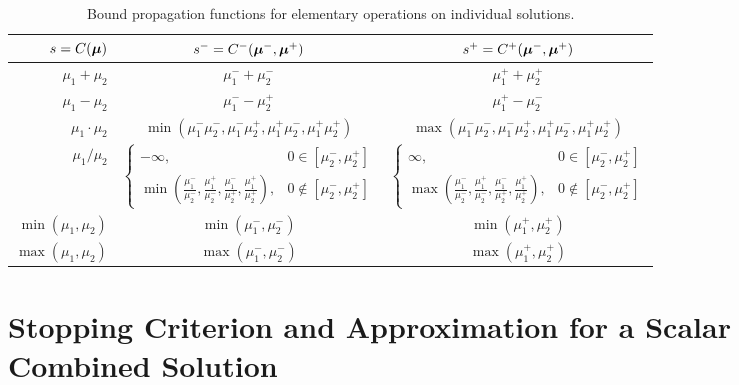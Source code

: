 \documentclass{article}[12pt]
\begin{document}
\begin{table}[t]
\begin{tabular}{r  c  c}
    $s=C(\boldsymbol{\mu})$ & $s^- = C^-(\boldsymbol{\mu}^-,\boldsymbol{\mu}^+)$ & $s^+ = C^+(\boldsymbol{\mu}^-,\boldsymbol{\mu}^+)$ \\
    \hline
    $\mu_1+\mu_2$ & $\mu_1^-+\mu_2^-$ & $\mu_1^++\mu_2^+$ \\
    $\mu_1-\mu_2$ & $\mu_1^--\mu_2^+$ & $\mu_1^+-\mu_2^-$ \\
    $\mu_1 \cdot \mu_2$ & $\min(\mu_1^-\mu_2^-,\mu_1^-\mu_2^+,\mu_1^+\mu_2^-,\mu_1^+\mu_2^+)$ & $\max(\mu_1^-\mu_2^-,\mu_1^-\mu_2^+,\mu_1^+\mu_2^-,\mu_1^+\mu_2^+)$ \\
    $\mu_1 / \mu_2$ & $\begin{cases} -\infty, & 0 \in [\mu_2^-,\mu_2^+] \\ \min\left(\frac{\mu_1^-}{\mu_2^-},\frac{\mu_1^+}{\mu_2^-},\frac{\mu_1^-}{\mu_2^+},\frac{\mu_1^+}{\mu_2^+}\right), & 0 \notin [\mu_2^-,\mu_2^+] \end{cases}$ & $\begin{cases} \infty, & 0 \in [\mu_2^-,\mu_2^+] \\ \max\left(\frac{\mu_1^-}{\mu_2^-},\frac{\mu_1^+}{\mu_2^-},\frac{\mu_1^-}{\mu_2^+},\frac{\mu_1^+}{\mu_2^+}\right), & 0 \notin [\mu_2^-,\mu_2^+] \end{cases}$ \\
    $\min(\mu_1,\mu_2)$ & $\min(\mu_1^-,\mu_2^-)$ & $\min(\mu_1^+,\mu_2^+)$ \\
    $\max(\mu_1,\mu_2)$ & $\max(\mu_1^-,\mu_2^-)$ & $\max(\mu_1^+,\mu_2^+)$ \\
    \hline
\end{tabular}
\caption{Bound propagation functions for elementary operations on individual solutions.}
\label{table:elementary_ops_Cpm}
\end{table}

\section{Stopping Criterion and Approximation for a Scalar Combined Solution} \label{sec:opt_comb_sol_sc}
\end{document}
